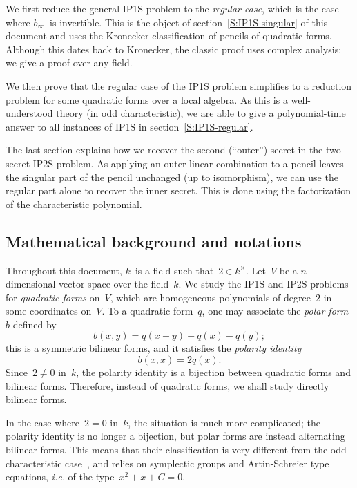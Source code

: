\documentclass{lms}%
\begin{document}
We first reduce the general IP1S problem to the \emph{regular case},
which is the case where $b_{∞}$~is invertible. This is the object of
section~\ref{S:IP1S-singular} of this document and uses the Kronecker
classification of pencils of quadratic forms. Although this dates back to
Kronecker, the classic proof uses complex analysis; we give a proof over
any field.

We then prove that the regular case of the IP1S problem simplifies to a
reduction problem for some quadratic forms over a local algebra. As this
is a well-understood theory (in odd characteristic), we are able to give
a polynomial-time answer to all instances of IP1S in
section~\ref{S:IP1S-regular}.

The last section explains how we recover the second (``outer'') secret in
the two-secret IP2S problem. As applying an outer linear combination to a
pencil leaves the singular part of the pencil unchanged (up to
isomorphism), we can use the regular part alone to recover the inner
secret. This is done using the factorization of the characteristic
polynomial.

\subsection*{Mathematical background and notations}%
Throughout this document, $k$~is a field such that~$2 ∈ k^{×}$.
Let~$V$ be a $n$-dimensional vector space over the field~$k$. We study
the IP1S and IP2S problems for \emph{quadratic forms} on~$V$, which are
homogeneous polynomials of degree~$2$ in some coordinates on~$V$. To a
quadratic form~$q$, one may associate the \emph{polar form}~$b$ defined
by
\begin{equation*}\label{eq:polar}
b(x,y) = q(x+y) - q(x) - q(y);
\end{equation*}
this is a symmetric bilinear forms, and it satisfies the \emph{polarity
identity}
\begin{equation*}\label{eq:polarity}
b(x,x) = 2q(x).
\end{equation*}
Since~$2 ≠ 0$ in~$k$, the polarity identity is a bijection between
quadratic forms and bilinear forms. Therefore, instead of quadratic
forms, we shall study directly bilinear forms.

In the case where~$2 = 0$ in~$k$, the situation is much more complicated;
the polarity identity is no longer a bijection, but polar forms are
instead alternating bilinear forms. This means that their classification is
very different from the odd-characteristic case~\cite{milnorhusemoller},
and relies on symplectic groups and Artin-Schreier type equations,
\emph{i.e.} of the type~$x^2+x+C = 0$.
\end{document}
